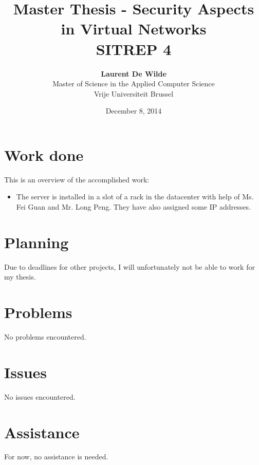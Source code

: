 \documentclass[11pt, a4paper]{article}
\title{Master Thesis -  Security Aspects in Virtual Networks\\ \textbf{SITREP 4}}
\author{\textbf{Laurent De Wilde} \\ Master of Science in the Applied Computer Science \\ Vrije Universiteit Brussel}
\date{December 8, 2014}
\begin{document}
\maketitle

\section{Work done}

This is an overview of the accomplished work:
\begin{itemize}
\item The server is installed in a slot of a rack in the datacenter with help of Ms. Fei Guan and Mr. Long Peng. They have also assigned some IP addresses.
\end{itemize}

\section{Planning}

Due to deadlines for other projects, I will unfortunately not be able to work for my thesis.

\section{Problems}

No problems encountered.

\section{Issues}

No issues encountered.

\section{Assistance}

For now, no assistance is needed.
\end{document}
